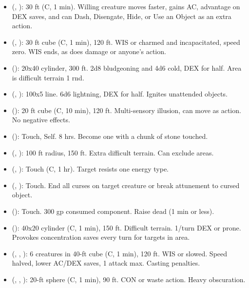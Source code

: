 \begin{itemize}
	\item {} (, ): 30 ft (C, 1 min). Willing creature moves faster, gains AC, advantage on DEX saves, and can Dash, Disengate, Hide, or Use an Object as an extra action.
	\item {} (, ): 30 ft cube (C, 1 min), 120 ft. WIS or charmed and incapacitated, speed zero. WIS ends, as does damage or anyone's action.
	\item {} (): 20x40 cylinder, 300 ft. 2d8 bludgeoning and 4d6 cold, DEX for half. Area is difficult terrain 1 rnd.
	\item {} (, ): 100x5 line. 6d6 lightning, DEX for half. Ignites unattended objects.
	\item {} (): 20 ft cube (C, 10 min), 120 ft. Multi-sensory illusion, can move as action. No negative effects.
	\item {} (): Touch, Self. 8 hrs. Become one with a chunk of stone touched.
	\item {} (, ): 100 ft radius, 150 ft. Extra difficult terrain. Can exclude areas.
	\item {} (, ): Touch (C, 1 hr). Target resists one energy type.
	\item {} (, ): Touch. End all curses on target creature or break attunement to cursed object.
	\item {} (): Touch. 300 gp consumed component. Raise dead (1 min or less).
	\item {} (): 40x20 cylinder (C, 1 min), 150 ft. Difficult terrain. 1/turn DEX or prone. Provokes concentration saves every turn for targets in area.
	\item {} (, , ): 6 creatures in 40-ft cube (C, 1 min), 120 ft. WIS or slowed. Speed halved, lower AC/DEX saves, 1 attack max. Casting penalties.
	\item {} (, , ): 20-ft sphere (C, 1 min), 90 ft. CON or waste action. Heavy obscuration.

\end{itemize}
